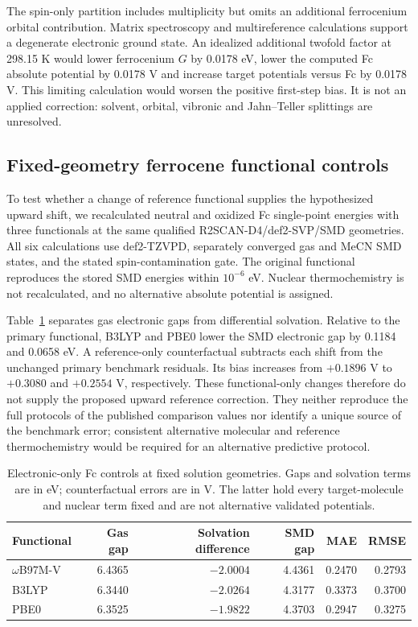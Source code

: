 \documentclass[11pt]{article}
\begin{document}
The spin-only partition includes multiplicity but omits an additional ferrocenium orbital contribution. Matrix spectroscopy and multireference calculations support a degenerate electronic ground state.\cite{fcorbital2017} An idealized additional twofold factor at 298.15 K would lower ferrocenium $G$ by 0.0178 eV, lower the computed Fc absolute potential by 0.0178 V and increase target potentials versus Fc by 0.0178 V. This limiting calculation would worsen the positive first-step bias. It is not an applied correction: solvent, orbital, vibronic and Jahn--Teller splittings are unresolved.
\subsection{Fixed-geometry ferrocene functional controls}
To test whether a change of reference functional supplies the hypothesized upward shift, we recalculated neutral and oxidized Fc single-point energies with three functionals at the same qualified R2SCAN-D4/def2-SVP/SMD geometries. All six calculations use def2-TZVPD, separately converged gas and MeCN SMD states, and the stated spin-contamination gate. The original functional reproduces the stored SMD energies within $10^{-6}$ eV. Nuclear thermochemistry is not recalculated, and no alternative absolute potential is assigned.

Table~\ref{tab:fc-functional} separates gas electronic gaps from differential solvation. Relative to the primary functional, B3LYP and PBE0 lower the SMD electronic gap by 0.1184 and 0.0658 eV. A reference-only counterfactual subtracts each shift from the unchanged primary benchmark residuals. Its bias increases from $+0.1896$ V to $+0.3080$ and $+0.2554$ V, respectively. These functional-only changes therefore do not supply the proposed upward reference correction. They neither reproduce the full protocols of the published comparison values nor identify a unique source of the benchmark error; consistent alternative molecular and reference thermochemistry would be required for an alternative predictive protocol.
\begin{table}[htbp]\centering\small
\caption{Electronic-only Fc controls at fixed solution geometries. Gaps and solvation terms are in eV; counterfactual errors are in V. The latter hold every target-molecule and nuclear term fixed and are not alternative validated potentials.}
\label{tab:fc-functional}
\begin{tabular}{lrrrrr}\toprule
Functional & Gas gap & Solvation difference & SMD gap & MAE & RMSE\\\midrule
$\omega$B97M-V & 6.4365 & $-2.0004$ & 4.4361 & 0.2470 & 0.2793\\
B3LYP & 6.3440 & $-2.0264$ & 4.3177 & 0.3373 & 0.3700\\
PBE0 & 6.3525 & $-1.9822$ & 4.3703 & 0.2947 & 0.3275\\\bottomrule
\end{tabular}\end{table}
\end{document}

